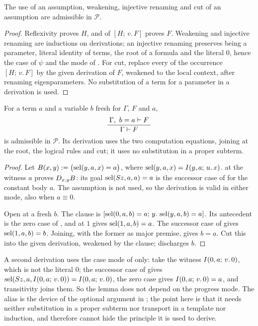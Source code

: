 \begin{lemma}
\label{disch:lem:param-struct}
The use of an assumption, weakening, injective renaming and cut of an
assumption are admissible in $\mathcal P$.
\end{lemma}

\begin{proof}
Reflexivity proves $H$, and  of $[H;\,v.\,F]$ proves $F$.
Weakening and injective renaming are inductions on derivations; an
injective renaming preserves being a parameter, literal identity of terms,
the root of a formula and the literal $0$, hence the case of $\psi$ and
the mode of . For cut, replace every  of the
occurrence $[H;\,v.\,F]$ by the given derivation of $F$, weakened to the
local context, after renaming eigenparameters. No substitution of a term
for a parameter in a derivation is used.
\end{proof}

\begin{lemma}
\label{disch:lem:alias}
For a term $a$ and a variable $b$ fresh for $\Gamma$, $F$ and $a$,
\[
 \dfrac{\;\Gamma,\ b=a\vdash F\;}{\;\Gamma\vdash F\;}
\]
is admissible in $\mathcal P$. Its derivation uses the two computation
equations, joining at the root, the logical rules and cut; it uses no
substitution in a proper subterm.
\end{lemma}

\begin{proof}
Let $B(x,y)\mathrel{:=}\bigl(\operatorname{sel}(y,a,x)=a\bigr)$, where
$\operatorname{sel}(y,a,x)=I(y,a;\,u.\,x)$.  at the witness $a$ proves
$D_{x,y}B$: its goal $\operatorname{sel}(S z,a,a)=a$ is the successor case of
 for the constant body $a$. The assumption is not used,
so the derivation is valid in either mode, also when $a\equiv 0$.

Open at a fresh $b$. The clause is
$[\operatorname{sel}(0,a,b)=a;\,y.\,\operatorname{sel}(y,a,b)=a]$. Its antecedent is the zero case of
, and  at $1$ gives $\operatorname{sel}(1,a,b)=a$. The
successor case of  gives $\operatorname{sel}(1,a,b)=b$. Joining, with
the former as major premise, gives $b=a$. Cut this into the given
derivation, weakened by the clause;  discharges $b$.
\end{proof}

A second derivation uses the case mode of  only: take the
witness $I(0,a;\,v.\,0)$, which is not the literal $0$; the successor
case of  gives
$\operatorname{sel}(S z,a,I(0,a;\,v.\,0))=I(0,a;\,v.\,0)$, the zero case gives
$I(0,a;\,v.\,0)=a$, and transitivity joins them. So the lemma does not
depend on the progress mode. The alias is the device of the optional
argument in ; the point here is that it needs neither
substitution in a proper subterm nor transport in a template nor
induction, and therefore cannot hide the principle it is used to derive.

